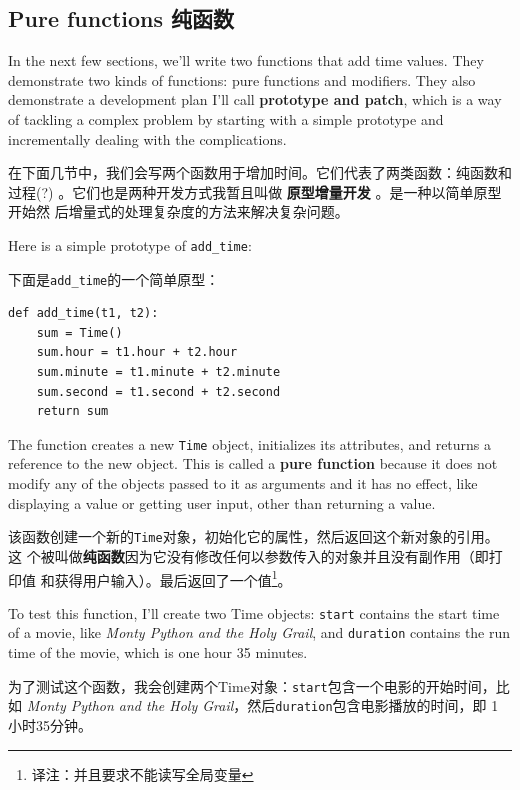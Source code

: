 \documentclass[10pt]{book}
\begin{document}
\begin{CJK}{UTF8}{gbsn}
\section{Pure functions 纯函数}

In the next few sections, we'll write two functions that add time
values.  They demonstrate two kinds of functions: pure functions and
modifiers.  They also demonstrate a development plan I'll call {\bf
  prototype and patch}, which is a way of tackling a complex problem
by starting with a simple prototype and incrementally dealing with the
complications.

在下面几节中，我们会写两个函数用于增加时间。它们代表了两类函数：纯函数和过程(?)
。它们也是两种开发方式我暂且叫做{\bf 
    原型增量开发
}。是一种以简单原型开始然
后增量式的处理复杂度的方法来解决复杂问题。

Here is a simple prototype of \verb"add_time":

下面是\verb"add_time"的一个简单原型：

\begin{verbatim}
def add_time(t1, t2):
    sum = Time()
    sum.hour = t1.hour + t2.hour
    sum.minute = t1.minute + t2.minute
    sum.second = t1.second + t2.second
    return sum
\end{verbatim}
%
The function creates a new {\tt Time} object, initializes its
attributes, and returns a reference to the new object.  This is called
a {\bf pure function} because it does not modify any of the objects
passed to it as arguments and it has no effect,
like displaying a value or getting user input, 
other than returning a value.

该函数创建一个新的{\tt Time}对象，初始化它的属性，然后返回这个新对象的引用。这
个被叫做{\bf 纯函数}因为它没有修改任何以参数传入的对象并且没有副作用（即打印值
和获得用户输入）。最后返回了一个值\footnote{译注：并且要求不能读写全局变量}。

To test this function, I'll create two Time objects: {\tt start}
contains the start time of a movie, like {\em Monty Python and the
Holy Grail}, and {\tt duration} contains the run time of the movie,
which is one hour 35 minutes.

为了测试这个函数，我会创建两个Time对象：{\tt start}包含一个电影的开始时间，比如
{\em Monty Python and the Holy Grail}，然后{\tt duration}包含电影播放的时间，即
1小时35分钟。


\end{CJK}
\end{document}
